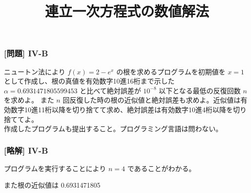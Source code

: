 \documentclass[dvipdfmx,aspectratio=169,20pt]{beamer}
\newcommand{\myfontsetting}[3]{{\fontsize{#1}{#2}\selectfont #3}}
\begin{document}
\graphicspath{{figs/}}

\begin{frame}
\frametitle{[問題] I\hspace{-.1em}V-B}
\myfontsetting{16pt}{18pt}{
ニュートン法により
}
\myfontsetting{14pt}{16pt}{
$f(x)=2-e^{x}$
}
\myfontsetting{16pt}{18pt}{
の根を求めるプログラムを初期値を $x=1$ として作成し、根の真値を有効数字10進16桁まで示した
}
\myfontsetting{14pt}{16pt}{
$\alpha=0.6931471805599453$
}
\myfontsetting{16pt}{18pt}{
と比べて絶対誤差が $10^{-8}$ 以下となる最低の反復回数 $n$ を求めよ。
また $n$ 回反復した時の根の近似値と絶対誤差も求めよ。近似値は有効数字10進11桁以降を切り捨てて求め、絶対誤差は有効数字10進4桁以降を切り捨ててよ。
}\\
\myfontsetting{12pt}{14pt}{
作成したプログラムも提出すること。プログラミング言語は問わない。
}
\end{frame}
\begin{frame}
\frametitle{[略解] I\hspace{-.1em}V-B}
\vspace{-0.5cm}
プログラムを実行することにより $n=4$ であることがわかる。
\vspace{0.5cm}

また根の近似値は 0.6931471805
\end{frame}

\title{{\Large 連立一次方程式の数値解法}}

\end{document}
